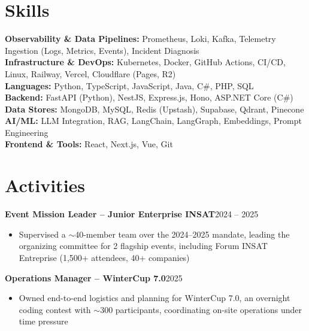 \documentclass[10pt,a4paper]{article}
\newcommand{\entry}[2]{\vspace{1pt}\noindent\textbf{#1}\hfill{\color{muted}#2}\par}
\begin{document}
\section{Skills}
\textbf{Observability \& Data Pipelines:} Prometheus, Loki, Kafka, Telemetry Ingestion (Logs, Metrics, Events), Incident Diagnosis\\
\textbf{Infrastructure \& DevOps:} Kubernetes, Docker, GitHub Actions, CI/CD, Linux, Railway, Vercel, Cloudflare (Pages, R2)\\
\textbf{Languages:} Python, TypeScript, JavaScript, Java, C\#, PHP, SQL\\
\textbf{Backend:} FastAPI (Python), NestJS, Express.js, Hono, ASP.NET Core (C\#)\\
\textbf{Data Stores:} MongoDB, MySQL, Redis (Upstash), Supabase, Qdrant, Pinecone\\
\textbf{AI/ML:} LLM Integration, RAG, LangChain, LangGraph, Embeddings, Prompt Engineering\\
\textbf{Frontend \& Tools:} React, Next.js, Vue, Git

\section{Activities}
\entry{Event Mission Leader -- Junior Enterprise INSAT}{2024 -- 2025}
\begin{itemize}
  \item Supervised a $\sim$40-member team over the 2024--2025 mandate, leading the organizing committee for 2 flagship events, including Forum INSAT Entreprise (1,500+ attendees, 40+ companies)
\end{itemize}
\entry{Operations Manager -- WinterCup 7.0}{2025}
\begin{itemize}
  \item Owned end-to-end logistics and planning for WinterCup 7.0, an overnight coding contest with $\sim$300 participants, coordinating on-site operations under time pressure
\end{itemize}
\end{document}

